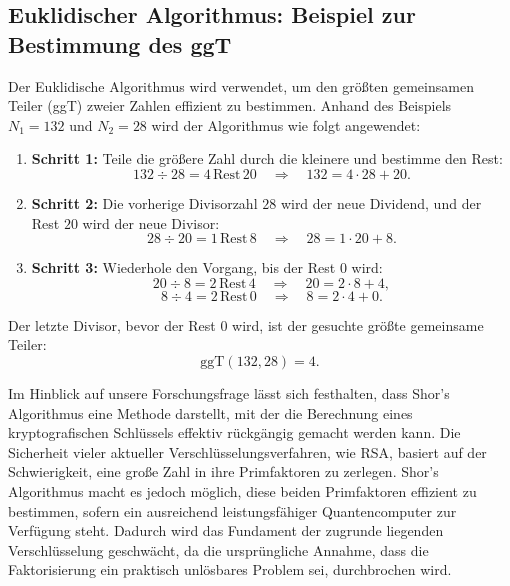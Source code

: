 \subsection{Euklidischer Algorithmus: Beispiel zur Bestimmung des ggT}

Der Euklidische Algorithmus wird verwendet, um den größten gemeinsamen 
Teiler (ggT) zweier Zahlen effizient zu bestimmen. Anhand des Beispiels 
$N_1 = 132$ und $N_2 = 28$ wird der Algorithmus wie folgt angewendet:

\begin{enumerate}
    \item \textbf{Schritt 1:}  
    Teile die größere Zahl durch die kleinere und bestimme den Rest:  
    \[
    132 \div 28 = 4 \, \text{Rest} \, 20 \quad \Rightarrow \quad 132 = 4 \cdot 28 + 20.
    \]

    \item \textbf{Schritt 2:}  
    Die vorherige Divisorzahl $28$ wird der neue Dividend, und der Rest $20$ wird der neue Divisor:  
    \[
    28 \div 20 = 1 \, \text{Rest} \, 8 \quad \Rightarrow \quad 28 = 1 \cdot 20 + 8.
    \]

    \item \textbf{Schritt 3:}  
    Wiederhole den Vorgang, bis der Rest $0$ wird:  
    \[
    20 \div 8 = 2 \, \text{Rest} \, 4 \quad \Rightarrow \quad 20 = 2 \cdot 8 + 4,
    \]  
    \[
    8 \div 4 = 2 \, \text{Rest} \, 0 \quad \Rightarrow \quad 8 = 2 \cdot 4 + 0.
    \]
\end{enumerate}

Der letzte Divisor, bevor der Rest $0$ wird, ist der gesuchte größte gemeinsame Teiler: \cite{euklid}
\[
\text{ggT}(132, 28) = 4. 
\] 

Im Hinblick auf unsere Forschungsfrage lässt sich festhalten, dass Shor's Algorithmus eine 
Methode darstellt, mit der die Berechnung eines kryptografischen Schlüssels effektiv rückgängig 
gemacht werden kann. Die Sicherheit vieler aktueller Verschlüsselungsverfahren, wie RSA, basiert 
auf der Schwierigkeit, eine große Zahl in ihre Primfaktoren zu zerlegen. Shor's Algorithmus macht 
es jedoch möglich, diese beiden Primfaktoren effizient zu bestimmen, sofern ein ausreichend 
leistungsfähiger Quantencomputer zur Verfügung steht. Dadurch wird das Fundament der zugrunde 
liegenden Verschlüsselung geschwächt, da die ursprüngliche Annahme, dass die Faktorisierung ein 
praktisch unlösbares Problem sei, durchbrochen wird.


